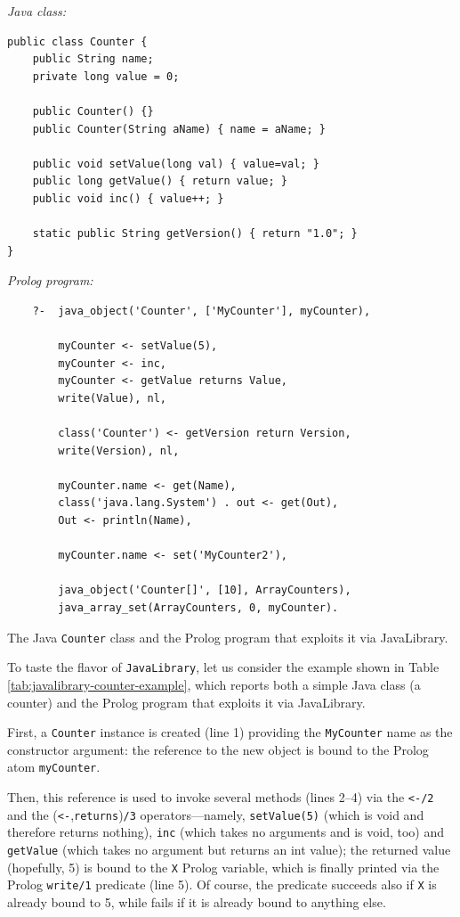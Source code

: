 \begin{table}
\textit{Java class:}
\begin{verbatim}
public class Counter {
    public String name;
    private long value = 0;

    public Counter() {}
    public Counter(String aName) { name = aName; }

    public void setValue(long val) { value=val; }
    public long getValue() { return value; }
    public void inc() { value++; }

    static public String getVersion() { return "1.0"; }
}
\end{verbatim}

\textit{Prolog program:}
\begin{verbatim}
    ?-  java_object('Counter', ['MyCounter'], myCounter),

        myCounter <- setValue(5),
        myCounter <- inc,
        myCounter <- getValue returns Value,
        write(Value), nl,

        class('Counter') <- getVersion return Version,
        write(Version), nl,

        myCounter.name <- get(Name),
        class('java.lang.System') . out <- get(Out),
        Out <- println(Name),

        myCounter.name <- set('MyCounter2'),

        java_object('Counter[]', [10], ArrayCounters),
        java_array_set(ArrayCounters, 0, myCounter).
\end{verbatim}
\caption{The Java \texttt{Counter} class and the Prolog program that exploits it via JavaLibrary.}
\label{tab:javalibrary-counter-example}
\end{table}

To taste the flavor of \texttt{JavaLibrary}, let us consider the example shown in Table \ref{tab:javalibrary-counter-example}, which reports both a simple Java class (a counter) and the Prolog program that exploits it via JavaLibrary.

First, a \texttt{Counter} instance is created (line 1) providing the \texttt{MyCounter} name as the constructor argument: the reference to the new object is bound to the Prolog atom \texttt{myCounter}.

Then, this reference is used to invoke several methods (lines 2--4) via the \verb|<-/2| and the (\verb|<-|,\texttt{returns})\texttt{/3} operators---namely, \texttt{setValue(5)} (which is void and therefore returns nothing), \texttt{inc} (which takes no arguments and is void, too) and \texttt{getValue} (which takes no argument but returns an int value);
the returned value (hopefully, 5) is bound to the \texttt{X} Prolog variable, which is finally printed via the Prolog \texttt{write/1} predicate (line 5).
%
Of course, the predicate succeeds also if \texttt{X} is already bound to 5, while fails if it is already bound to anything else.

